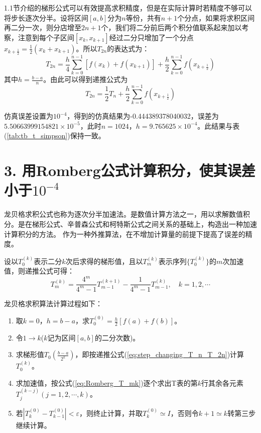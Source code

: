 1.1节介绍的梯形公式可以有效提高求积精度，但是在实际计算时若精度不够可以将步长逐次分半。设将区间$[a,b]$分为$n$等份，共有$n+1$个分点，如果将求积区间再二分一次，则分店增至$2n+1$个，我们将二分前后两个积分值联系起来加以考察，注意到每个子区间$[x_k, x_{k+1}]$经过二分只增加了一个分点$x_{k+\frac{1}{2}} = \frac{1}{2}(x_k + x_{k+1})$。所以$T_{2n}$的表达式为：
\begin{equation}
    T_{2n} = \frac{h}{4} \sum_{k=0}^{n-1} [f(x_k) + f(x_{k+1})] + \frac{h}{2} \sum_{k=0}^{n-1} f(x_{k+\frac{1}{2}})
    \label{eq:step_changing_T_2n}
\end{equation}
其中$h=\frac{b-a}{n}$。由此可以得到递推公式为
\begin{equation}
    T_{2n} = \frac{1}{2} T_n + \frac{h}{2} \sum_{k=0}^{n-1} f(x_{k+\frac{1}{2}})
    \label{eq:step_changing_T_n_T_2n}
\end{equation}

仿真误差设置为$10^{-4}$，得到的仿真结果为-0.444389378040032，误差为$5.50663999154821\times10^{-5}$，此时$n=1024$，$h = 9.765625\times 10^{-4}$。此结果与表(\ref{tab:tb_t_simpson})保持一致。
\newpage
\section*{3. 用Romberg公式计算积分，使其误差小于$10^{-4}$}

龙贝格求积公式也称为逐次分半加速法。是数值计算方法之一，用以求解数值积分。是在梯形公式、辛普森公式和柯特斯公式之间关系的基础上，构造出一种加速计算积分的方法。 作为一种外推算法，在不增加计算量的前提下提高了误差的精度。

设以$T_0^{(k)}$表示二分$k$次后求得的梯形值，且以$T_m^{(k)}$表示序列$\{T_0^{(k)}\}$的$m$次加速值，则递推公式可得：
\begin{equation}
    T_m^{(k)} = \frac{4^m}{4^m - 1} T_{m-1}^{(k+1)} - \frac{1}{4^m -1} T_{m-1}^{(k)}, \quad k=1,2,\cdots
    \label{eq:Romberg_T_mk}
\end{equation}

龙贝格求积算法计算过程如下：
\begin{enumerate}
    \item 取$k=0$，$h=b-a$，求$T_0^{(0)} = \frac{h}{2} [f(a) + f(b)]$。
    \item 令$1\longrightarrow k$($k$记为区间$[a,b]$的二分次数)。
    \item 求梯形值$T_0\left(\frac{b-a}{2^k}\right)$，即按递推公式(\ref{eq:step_changing_T_n_T_2n})计算$T_0^{(k)}$。
    \item 求加速值，按公式(\ref{eq:Romberg_T_mk})逐个求出T表的第$k$行其余各元素$T_j^{(k-j)}(j=1,2,\cdots,k)$。
    \item 若$|T_k^{(0)} - T_{k-1}^{(0)}|<\varepsilon $，则终止计算，并取$T_k^{(0)}\simeq I$，否则令$k+1\simeq k$转第三步继续计算。
\end{enumerate}

